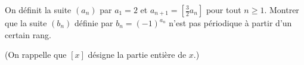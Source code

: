 On définit la suite $(a_n)$ par $a_1 = 2$ et $a_{n+1} = \left[\frac{3}{2}a_n\right]$ pour tout $n \geq 1$. Montrer que la suite $(b_n)$ définie par $b_n = (-1)^{a_n}$ n'est pas périodique à partir d'un certain rang.

(On rappelle que $[x]$ désigne la partie entière de $x$.)
